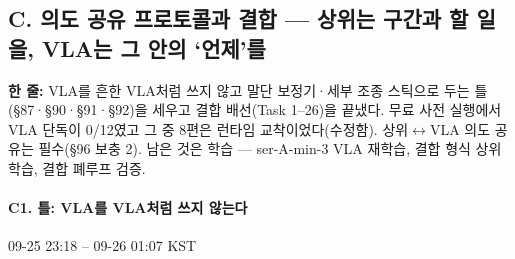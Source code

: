 \subsection{C. 의도 공유 프로토콜과 결합 --- 상위는 구간과 할 일을, VLA는 그 안의 `언제'를}\label{rec:C}
\noindent\textbf{한 줄:} VLA를 흔한 VLA처럼 쓰지 않고 말단 보정기·세부 조종 스틱으로 두는 틀(§87·§90·§91·§92)을 세우고 결합 배선(Task 1--26)을 끝냈다. 무료 사전 실행에서 VLA 단독이 0/12였고 그 중 8편은 런타임 교착이었다(수정함). 상위$\leftrightarrow$VLA 의도 공유는 필수(§96 보충 2). 남은 것은 학습 --- ser-A-min-3 VLA 재학습, 결합 형식 상위 학습, 결합 폐루프 검증.

\paragraph{C1. 틀: VLA를 VLA처럼 쓰지 않는다}
{\small 09-25 23:18 -- 09-26 01:07 KST}
